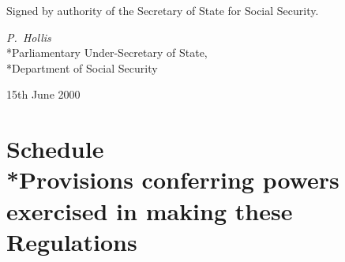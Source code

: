\documentclass[12pt,a4paper]{article}
\begin{document}
\bigskip

Signed 
by authority of the Secretary of State for Social Security.

{\raggedleft
\emph{P.\ Hollis
}\\*Parliamentary Under-Secretary of State,\\*Department of Social Security

}

15th June 2000

\small

\part[Schedule --- Provisions conferring powers exercised in making these Regulations]{Schedule\\*Provisions conferring powers exercised in making these Regulations}

\renewcommand\parthead{--- Schedule}
\end{document}
